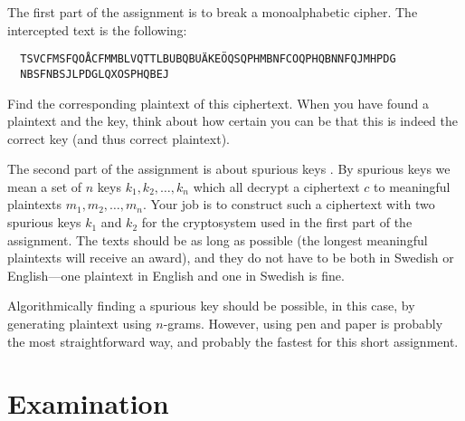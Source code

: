 \documentclass[a4paper]{llncs}
\begin{document}
The first part of the assignment is to break a monoalphabetic cipher.
The intercepted text is the following:
\begin{verbatim}
  TSVCFMSFQOÅCFMMBLVQTTLBUBQBUÄKEÖQSQPHMBNFCOQPHQBNNFQJMHPDG
  NBSFNBSJLPDGLQXOSPHQBEJ
\end{verbatim}
Find the corresponding plaintext of this ciphertext.
When you have found a plaintext and the key, think about how certain you can be 
that this is indeed the correct key (and thus correct plaintext).

The second part of the assignment is about spurious keys 
\cite[Chap.~2]{Stinson2006cta}.
By spurious keys we mean a set of \(n\) keys \(k_1, k_2, \ldots, k_n\) which 
all decrypt a ciphertext \(c\) to meaningful plaintexts \(m_1, m_2, \ldots, 
m_n\).
Your job is to construct such a ciphertext with two spurious keys \(k_1\) and 
\(k_2\) for the cryptosystem used in the first part of the assignment.
The texts should be as long as possible (the longest meaningful plaintexts will 
receive an award), and they do not have to be both in Swedish or English---one 
plaintext in English and one in Swedish is fine.

Algorithmically finding a spurious key should be possible, in this case, by 
generating plaintext using \(n\)-grams.
However, using pen and paper is probably the most straightforward way, and 
probably the fastest for this short assignment.


\section{Examination}
\end{document}
